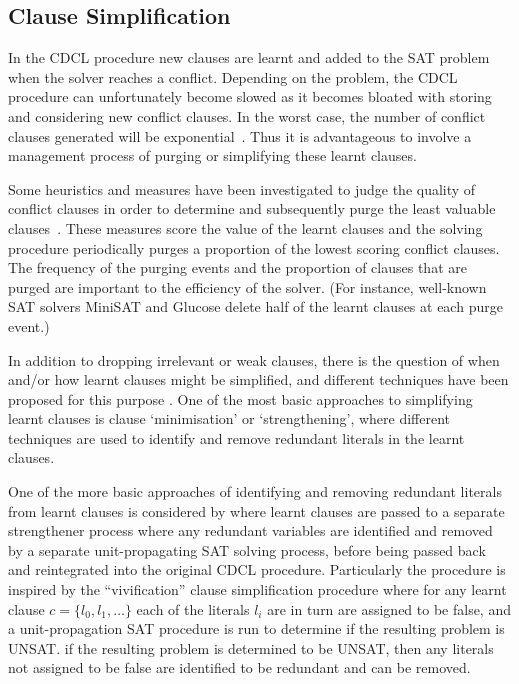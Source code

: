 \documentclass[
10pt, %
a4paper, %
oneside, %
headinclude,footinclude, %
BCOR5mm, %
]{scrartcl}
\begin{document}
\subsection{Clause Simplification}\label{sec:simplification}

In the CDCL procedure new clauses are learnt and added to the SAT problem when the solver reaches a conflict.
Depending on the problem, the CDCL procedure can unfortunately become slowed as it becomes bloated with storing and considering new conflict clauses.
In the worst case, the number of conflict clauses generated will be exponential~\cite{DBLP:journals/corr/LonlacN17,6984546}.
Thus it is advantageous to involve a management process of purging or simplifying these learnt clauses.

Some heuristics and measures have been investigated to judge the quality of conflict clauses in order to determine and subsequently purge the least valuable clauses~\cite{DBLP:journals/corr/LonlacN17,6984546}.
These measures score the value of the learnt clauses and the solving procedure periodically purges a proportion of the lowest scoring conflict clauses.
The frequency of the purging events and the proportion of clauses that are purged are important to the efficiency of the solver.
(For instance, well-known SAT solvers {\textsc MiniSAT} and {\textsc Glucose} delete half of the learnt clauses at each purge event.)

In addition to dropping irrelevant or weak clauses, there is the question of when and/or how learnt clauses might be simplified, and different techniques have been proposed for this
purpose \cite{ijcai2017-98}.
One of the most basic approaches to simplifying learnt clauses is clause `minimisation' or `strengthening', where different techniques are used to 
identify and remove redundant literals in the learnt clauses.\cite{10.1007/978-3-642-02777-2_23}

One of the more basic approaches of identifying and removing redundant literals from learnt clauses is considered by \cite{DBLP:conf/sat/WieringaH13}
 where learnt clauses are passed to a separate strengthener process where any redundant variables are identified and removed by a separate unit-propagating SAT solving process, before being 
passed back and reintegrated into the original CDCL procedure.
Particularly the procedure is inspired by the ``vivification'' clause simplification procedure \cite{DBLP:conf/ecai/PietteHS08} where for any learnt clause $c = \{l_0,l_1,\dots\}$
each of the literals $l_i$ are in turn are assigned to be false, and a unit-propagation SAT procedure is run to determine if the resulting problem is UNSAT.
if the resulting problem is determined to be UNSAT, then any literals not assigned to be false are identified to be redundant and can be removed.
\end{document}

